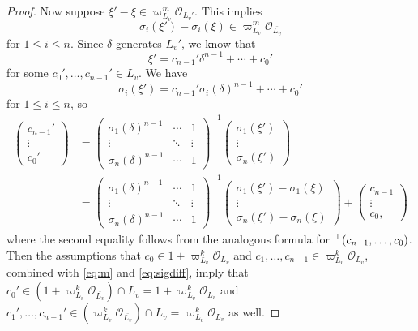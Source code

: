 \documentclass[11pt, reqno]{amsart}
\numberwithin{equation}{subsection}
\theoremstyle{plain}
\theoremstyle{definition}
\renewcommand{\O}{\mathcal O}
\newcommand{\ol}{\overline}
\newcommand{\transp}{\prescript{\top}{}{}}
\begin{document}
\begin{proof}
Now suppose $\xi' - \xi \in \varpi_{L_v}^m\O_{L_v'}$.
This implies 
\begin{equation}
\label{eq:sigdiff}
    \sigma_i(\xi') - \sigma_i(\xi) \in \varpi_{L_v}^m
    \O_{\ol{L_v}}
\end{equation}
for $1 \le i \le n$.
Since $\delta$ generates $L_v'$, we know that
\[
    \xi' = c_{n-1}'\delta^{n-1} + \cdots + c_0'
\]
for some $c_0',\dots, c_{n-1}' \in L_v$.
We have
\[
    \sigma_i(\xi') = c_{n-1}'\sigma_i(\delta)^{n-1} + \cdots + c_0'
\]
for $1 \le i \le n$, so
\begin{align*}
    \begin{pmatrix}
        c_{n-1}' \\ \vdots \\ c_0' 
    \end{pmatrix} &= 
    \begin{pmatrix}
        \sigma_1(\delta)^{n-1} & \cdots & 1 \\
        \vdots & \ddots & \vdots \\
        \sigma_n(\delta)^{n-1} & \cdots & 1
    \end{pmatrix}^{-1} 
    \begin{pmatrix}
        \sigma_1(\xi') \\ \vdots \\ \sigma_n(\xi')
    \end{pmatrix} \\
    &= \begin{pmatrix}
        \sigma_1(\delta)^{n-1} & \cdots & 1 \\
        \vdots & \ddots & \vdots \\
        \sigma_n(\delta)^{n-1} & \cdots & 1
    \end{pmatrix}^{-1} 
    \begin{pmatrix}
        \sigma_1(\xi') - \sigma_1(\xi) \\ \vdots \\ \sigma_n(\xi') - \sigma_n(\xi)
    \end{pmatrix} +
    \begin{pmatrix}
        c_{n-1} \\ \vdots \\ c_0,
    \end{pmatrix}
\end{align*}
where the second equality follows from the analogous
formula for $\transp{(c_{n-1}, \dots, c_0)}$.
Then the assumptions that $c_0 \in 1 + \varpi_{L_v}^k
\O_{L_v}$ and $c_1, \dots, c_{n-1} \in 
\varpi_{L_v}^k\O_{L_v}$, combined with \eqref{eq:m} and
\eqref{eq:sigdiff}, imply that 
$c_0' \in (1 + \varpi_{L_v}^k\O_{\ol{L_v}}) \cap L_v
= 1 + \varpi_{L_v}^k\O_{L_v}$ and $c_1', \dots, c_{n-1}'
\in (\varpi_{L_v}^k\O_{\ol{L_v}}) \cap L_v 
= \varpi_{L_v}^k\O_{L_v}$ as well.
\end{proof}
\end{document}
